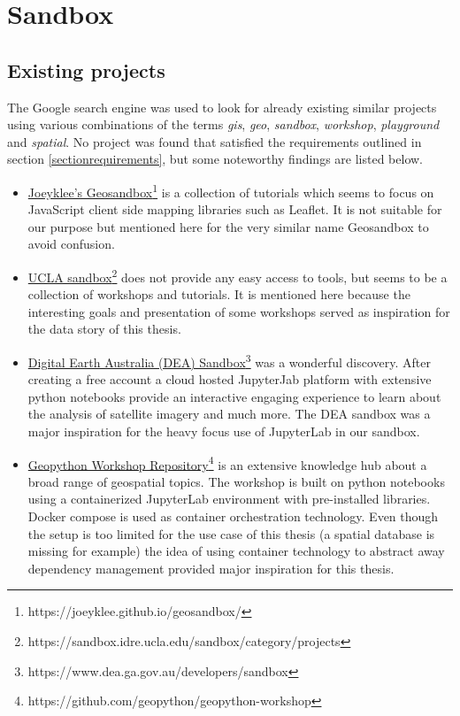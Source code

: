 \documentclass[11pt, a4paper, oneside, parskip=full-]{scrartcl}
\begin{document}
\section{Sandbox}

\subsection{Existing projects}
The Google search engine was used to look for already existing similar projects
using various combinations of the terms \emph{gis}, \emph{geo}, \emph{sandbox},
\emph{workshop}, \emph{playground} and \emph{spatial}. No project was found that
satisfied the requirements outlined in section \ref{sectionrequirements}, but
some noteworthy findings are listed below.

\begin{itemize}
  \item \href{https://joeyklee.github.io/geosandbox/}{Joeyklee's
  Geosandbox}\footnote{https://joeyklee.github.io/geosandbox/} is a collection
  of tutorials which seems to focus on JavaScript client side mapping libraries
  such as Leaflet. It is not suitable for our purpose but mentioned here for the
  very similar name Geosandbox to avoid confusion.
  \item \href{https://sandbox.idre.ucla.edu/sandbox/category/projects}{UCLA
  sandbox}\footnote{https://sandbox.idre.ucla.edu/sandbox/category/projects}
  does not provide any easy access to tools, but seems to be a collection of
  workshops and tutorials. It is mentioned here because the interesting goals
  and presentation of some workshops served as inspiration for the data story of
  this thesis.
  \item \href{https://www.dea.ga.gov.au/developers/sandbox}{Digital Earth
  Australia (DEA)
  Sandbox}\footnote{https://www.dea.ga.gov.au/developers/sandbox} was a
  wonderful discovery. After creating a free account a cloud hosted JupyterJab
  platform with extensive python notebooks provide an interactive engaging
  experience to learn about the analysis of satellite imagery and much more. The
  DEA sandbox was a major inspiration for the heavy focus use of JupyterLab in
  our sandbox.
  \item \href{https://github.com/geopython/geopython-workshop}{Geopython
  Workshop Repository}\footnote{https://github.com/geopython/geopython-workshop}
  is an extensive knowledge hub about a broad range of geospatial topics. The
  workshop is built on python notebooks using a containerized JupyterLab
  environment with pre-installed libraries. Docker compose is used as container
  orchestration technology. Even though the setup is too limited for the use
  case of this thesis (a spatial database is missing for example) the idea of
  using container technology to abstract away dependency management provided
  major inspiration for this thesis.
\end{itemize}
\end{document}
